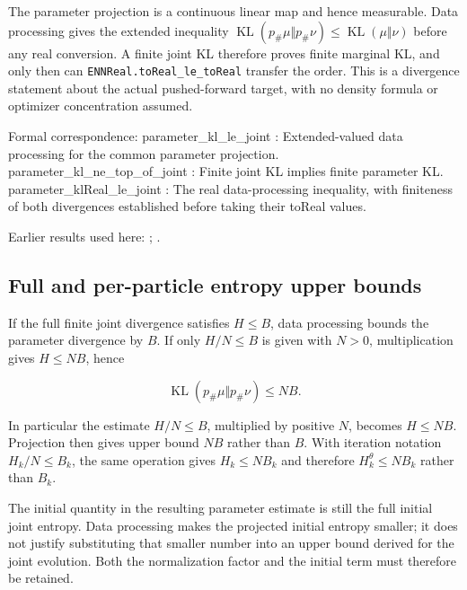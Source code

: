 \documentclass[11pt,a4paper]{report}
\begin{document}
\begin{leanbox}
The parameter projection is a continuous linear map and hence measurable. Data processing gives the extended inequality \(\operatorname{KL}(p_\#\mu\Vert p_\#\nu)\le\operatorname{KL}(\mu\Vert\nu)\) before any real conversion. A finite joint KL therefore proves finite marginal KL, and only then can \texttt{ENNReal.\allowbreak{}to\allowbreak{}Real\_\allowbreak{}le\_\allowbreak{}to\allowbreak{}Real} transfer the order. This is a divergence statement about the actual pushed-forward target, with no density formula or optimizer concentration assumed.



Formal correspondence: parameter\_kl\_le\_joint : Extended-valued data processing for the common parameter projection. parameter\_kl\_ne\_top\_of\_joint : Finite joint KL implies finite parameter KL. parameter\_klReal\_le\_joint : The real data-processing inequality, with finiteness of both divergences established before taking their toReal values.
\end{leanbox}


Earlier results used here: \cite[Section~3.1.1]{LangevinLean2026IPLA}; \cite[Section~3.1.6]{LangevinLean2026IPLA}.
\subsection{\texorpdfstring{Full and per-particle entropy upper bounds}{Full and per-particle entropy upper bounds}}
\label{report-step-IPLA-LSI-Marginal-lean-3}


If the full finite joint divergence satisfies \(H\le B\), data processing bounds the parameter divergence by \(B\). If only \(H/N\le B\) is given with \(N>0\), multiplication gives \(H\le NB\), hence

\[\operatorname{KL}(p_\#\mu\Vert p_\#\nu)\le NB.\]

In particular the estimate \(H/N\le B\), multiplied by positive \(N\), becomes \(H\le NB\). Projection then gives upper bound \(NB\) rather than \(B\). With iteration notation \(H_k/N\le B_k\), the same operation gives \(H_k\le NB_k\) and therefore \(H_k^\theta\le NB_k\) rather than \(B_k\).



The initial quantity in the resulting parameter estimate is still the full initial joint entropy. Data processing makes the projected initial entropy smaller; it does not justify substituting that smaller number into an upper bound derived for the joint evolution. Both the normalization factor and the initial term must therefore be retained.
\end{document}
